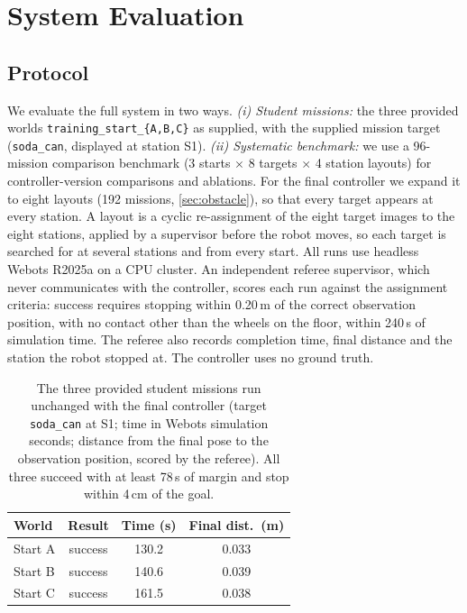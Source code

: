 \section{System Evaluation}
\label{sec:evaluation}

\subsection{Protocol}
We evaluate the full system in two ways. \emph{(i) Student missions:} the three provided worlds \texttt{training\_start\_\{A,B,C\}} as supplied, with the supplied mission target (\texttt{soda\_can}, displayed at station S1). \emph{(ii) Systematic benchmark:} we use a 96-mission comparison benchmark (3 starts $\times$ 8 targets $\times$ 4 station layouts) for controller-version comparisons and ablations. For the final controller we expand it to eight layouts (192 missions, \cref{sec:obstacle}), so that every target appears at every station. A layout is a cyclic re-assignment of the eight target images to the eight stations, applied by a supervisor before the robot moves, so each target is searched for at several stations and from every start. All runs use headless Webots R2025a on a CPU cluster. An independent referee supervisor, which never communicates with the controller, scores each run against the assignment criteria: success requires stopping within 0.20\,m of the correct observation position, with no contact other than the wheels on the floor, within 240\,s of simulation time. The referee also records completion time, final distance and the station the robot stopped at. The controller uses no ground truth.

\begin{table}[tbp]
  \centering\small
  \begin{tabular}{@{}lccc@{}}
    \toprule
    World & Result & Time (s) & Final dist.\ (m) \\
    \midrule
    Start A & success & 130.2 & 0.033 \\
    Start B & success & 140.6 & 0.039 \\
    Start C & success & 161.5 & 0.038 \\
    \bottomrule
  \end{tabular}
  \caption{The three provided student missions run unchanged with the final controller (target \texttt{soda\_can} at S1; time in Webots simulation seconds; distance from the final pose to the observation position, scored by the referee). All three succeed with at least 78\,s of margin and stop within 4\,cm of the goal.}
  \label{tab:missions}
\end{table}

